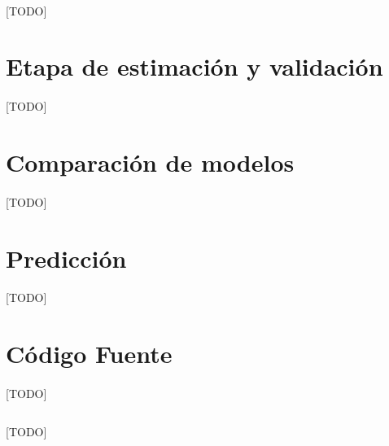 \documentclass[a4paper, spanish]{article}
\begin{document}
    \paragraph{}
    [TODO]

  \section{Etapa de estimación y validación}

    \paragraph{}
    [TODO]

  \section{Comparación de modelos}

    \paragraph{}
    [TODO]

  \section{Predicción}

    \paragraph{}
    [TODO]

  \appendix
  \section{Código Fuente}

    \paragraph{}
    [TODO]


    \begin{listing}[H]
        \centering
        \inputminted{R}{./res/code/weight-loss.r}
        \caption{[TODO]}
        \label{}
      \end{listing}
\end{document}
